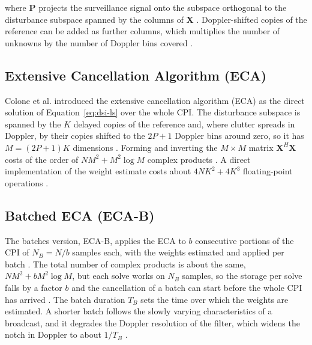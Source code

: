 where $\mathbf{P}$ projects the surveillance signal onto the subspace orthogonal to the disturbance subspace spanned by the columns of $\mathbf{X}$ \citep{colone2009}. Doppler-shifted copies of the reference can be added as further columns, which multiplies the number of unknowns by the number of Doppler bins covered \citep{colone2006,colone2009}.

\subsection{Extensive Cancellation Algorithm (ECA)}
\label{subsec:th.dsi.eca}
\todo{}
Colone et al. \citep{colone2006} introduced the extensive cancellation algorithm (ECA) as the direct solution of Equation~\ref{eq:dsi-ls} over the whole CPI. The disturbance subspace is spanned by the $K$ delayed copies of the reference and, where clutter spreads in Doppler, by their copies shifted to the $2P+1$ Doppler bins around zero, so it has $M = (2P+1)K$ dimensions \citep{colone2006,colone2009}. Forming and inverting the $M \times M$ matrix $\mathbf{X}^H \mathbf{X}$ costs of the order of $NM^2 + M^2 \log M$ complex products \citep{colone2009}. A direct implementation of the weight estimate costs about $4NK^2 + 4K^3$ floating-point operations \citep{colone2016}.

\subsection{Batched ECA (ECA-B)}
\label{subsec:th.dsi.ecab}
\todo{}
The batches version, ECA-B, applies the ECA to $b$ consecutive portions of the CPI of $N_B = N/b$ samples each, with the weights estimated and applied per batch \citep{colone2009}. The total number of complex products is about the same, $NM^2 + bM^2 \log M$, but each solve works on $N_B$ samples, so the storage per solve falls by a factor $b$ and the cancellation of a batch can start before the whole CPI has arrived \citep{colone2009}. The batch duration $T_B$ sets the time over which the weights are estimated. A shorter batch follows the slowly varying characteristics of a broadcast, and it degrades the Doppler resolution of the filter, which widens the notch in Doppler to about $1/T_B$ \citep{colone2009,colone2016}.

